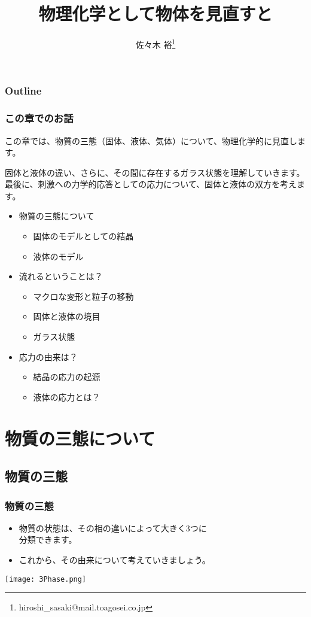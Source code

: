 \documentclass[12pt, dvipdfmx]{beamer}
\title
[物理化学として物体を見直すと]
{物理化学として物体を見直すと}
\author[東亞合成　佐々木]{佐々木 裕\thanks{hiroshi\_sasaki@mail.toagosei.co.jp}}
\institute[東亞合成]{東亞合成株式会社}
\date{}
\begin{document}
\maketitle

\begin{frame}
\frametitle{Outline}
\tableofcontents
\end{frame}

\begin{frame}
	\frametitle{この章でのお話}
	この章では、物質の三態（固体、液体、気体）について、物理化学的に見直します。

	固体と液体の違い、さらに、その間に存在するガラス状態を理解していきます。
	最後に、刺激への力学的応答としての応力について、固体と液体の双方を考えます。

	\begin{itemize}
		\item 物質の三態について
		\begin{itemize}
			\item 固体のモデルとしての結晶
			\item 液体のモデル
		\end{itemize} 
		\item 流れるということは？
		\begin{itemize}
			\item マクロな変形と粒子の移動
			\item 固体と液体の境目
			\item ガラス状態
		\end{itemize} 
		\item 応力の由来は？
		\begin{itemize}
			\item 結晶の応力の起源
			\item 液体の応力とは？
		\end{itemize}
	\end{itemize}
\end{frame}

\section{物質の三態について}
\subsection{物質の三態}
\begin{frame}
	\frametitle{物質の三態}
	\begin{itemize}
		\item 物質の状態は、その相の違いによって大きく3つに\\分類できます。
		\item これから、その由来について考えていきましょう。
	\end{itemize}
		\begin{center}
			\texttt{[image: 3Phase.png]}
		\end{center}
\end{frame}
\end{document}
